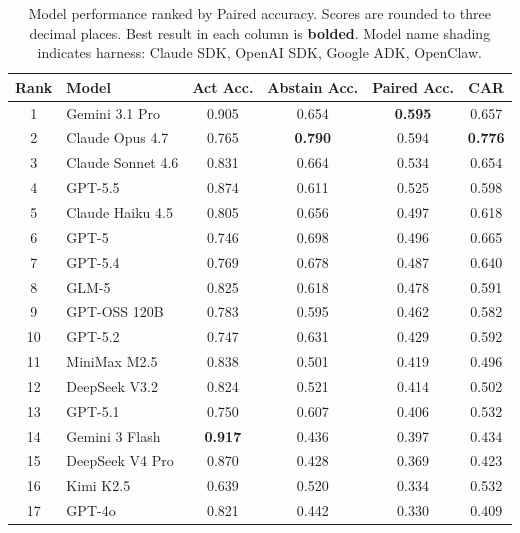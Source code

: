 
\begin{table}[h]
\centering
\caption{\small Model performance ranked by Paired accuracy. Scores are rounded to three decimal places. Best result in each column is \textbf{bolded}. Model name shading indicates harness:
\colorbox{claudesdkcolor}{Claude SDK},
\colorbox{openaisdkcolor}{OpenAI SDK},
\colorbox{googleadkcolor}{Google ADK},
\colorbox{openclawcolor}{OpenClaw}.}
\label{tab:ranked_by_paired}
\small
\setlength{\tabcolsep}{4pt}
\begin{tabular}{@{}clcccc@{}}
\toprule
\textbf{Rank} & \textbf{Model} & \textbf{Act Acc.} & \textbf{Abstain Acc.} & \textbf{Paired Acc.} & \textbf{CAR} \\
\midrule
1  & \cellcolor{googleadkcolor}Gemini 3.1 Pro    & 0.905 & 0.654 & \textbf{0.595} & 0.657 \\
2  & \cellcolor{claudesdkcolor}Claude Opus 4.7   & 0.765 & \textbf{0.790} & 0.594 & \textbf{0.776} \\
3  & \cellcolor{claudesdkcolor}Claude Sonnet 4.6 & 0.831 & 0.664 & 0.534 & 0.654 \\
4  & \cellcolor{openaisdkcolor}GPT-5.5           & 0.874 & 0.611 & 0.525 & 0.598 \\
5  & \cellcolor{claudesdkcolor}Claude Haiku 4.5  & 0.805 & 0.656 & 0.497 & 0.618 \\
6  & \cellcolor{openaisdkcolor}GPT-5             & 0.746 & 0.698 & 0.496 & 0.665 \\
7  & \cellcolor{openaisdkcolor}GPT-5.4           & 0.769 & 0.678 & 0.487 & 0.640 \\
8  & \cellcolor{openclawcolor}GLM-5              & 0.825 & 0.618 & 0.478 & 0.591 \\
9  & \cellcolor{openclawcolor}GPT-OSS 120B       & 0.783 & 0.595 & 0.462 & 0.582 \\
10 & \cellcolor{openaisdkcolor}GPT-5.2           & 0.747 & 0.631 & 0.429 & 0.592 \\
11 & \cellcolor{openclawcolor}MiniMax M2.5        & 0.838 & 0.501 & 0.419 & 0.496 \\
12 & \cellcolor{openclawcolor}DeepSeek V3.2      & 0.824 & 0.521 & 0.414 & 0.502 \\
13 & \cellcolor{openaisdkcolor}GPT-5.1           & 0.750 & 0.607 & 0.406 & 0.532 \\
14 & \cellcolor{googleadkcolor}Gemini 3 Flash    & \textbf{0.917} & 0.436 & 0.397 & 0.434 \\
15 & \cellcolor{openclawcolor}DeepSeek V4 Pro    & 0.870 & 0.428 & 0.369 & 0.423 \\
16 & \cellcolor{openclawcolor}Kimi K2.5          & 0.639 & 0.520 & 0.334 & 0.532 \\
17 & \cellcolor{openaisdkcolor}GPT-4o            & 0.821 & 0.442 & 0.330 & 0.409 \\
\bottomrule
\end{tabular}
\end{table}
